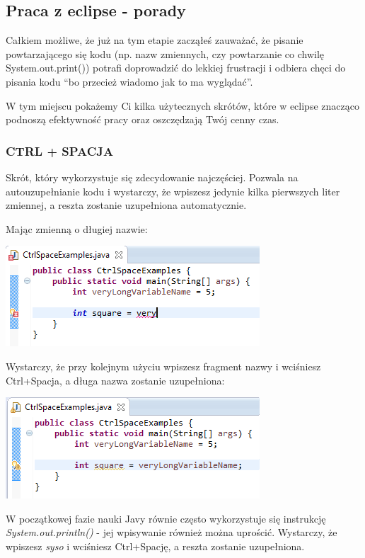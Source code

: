 \documentclass[letterpaper,10pt,english]{sphinxmanual}
\begin{document}
\subsection{Praca z eclipse - porady}
\label{wprowadzenie:praca-z-eclipse-porady}\label{wprowadzenie:gre-w-okrety}
Całkiem możliwe, że już na tym etapie zacząłeś zauważać, że pisanie powtarzającego się kodu (np. nazw zmiennych, czy powtarzanie co chwilę System.out.print()) potrafi doprowadzić do lekkiej frustracji i odbiera chęci do pisania kodu ``bo przecież wiadomo jak to ma wyglądać''.

W tym miejscu pokażemy Ci kilka użytecznych skrótów, które w eclipse znacząco podnoszą efektywność pracy oraz oszczędzają Twój cenny czas.


\subsubsection{CTRL + SPACJA}
\label{wprowadzenie:ctrl-spacja}
Skrót, który wykorzystuje się zdecydowanie najczęściej. Pozwala na autouzupełnianie kodu i wystarczy, że wpiszesz jedynie kilka pierwszych liter zmiennej, a reszta zostanie uzupełniona automatycznie.

Mając zmienną o długiej nazwie:

{\hfill\includegraphics{ctrlspace_1.png}\hfill}

Wystarczy, że przy kolejnym użyciu wpiszesz fragment nazwy i wciśniesz Ctrl+Spacja, a długa nazwa zostanie uzupełniona:

{\hfill\includegraphics{ctrlspace_2.png}\hfill}

W początkowej fazie nauki Javy równie często wykorzystuje się instrukcję \emph{System.out.println()} - jej wpisywanie również można uprościć. Wystarczy, że wpiszesz \emph{syso} i wciśniesz Ctrl+Spację, a reszta zostanie uzupełniona.
\end{document}

